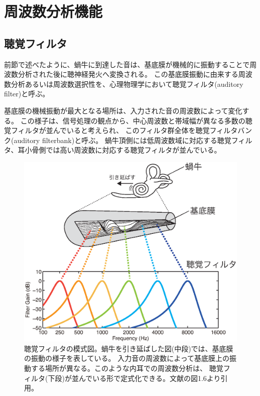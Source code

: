 \section{周波数分析機能}

\subsection{聴覚フィルタ}
前節で述べたように、蝸牛に到達した音は、基底膜が機械的に振動することで周波数分析された後に聴神経発火へ変換される。
この基底膜振動に由来する周波数分析あるいは周波数選択性を、心理物理学において聴覚フィルタ(auditory filter)と呼ぶ。

基底膜の機械振動が最大となる場所は、入力された音の周波数によって変化する。
この様子は、信号処理の観点から、中心周波数と帯域幅が異なる多数の聴覚フィルタが並んでいると考えられ、
このフィルタ群全体を聴覚フィルタバンク(auditory filterbank)と呼ぶ。
蝸牛頂側には低周波数域に対応する聴覚フィルタ、耳小骨側では高い周波数に対応する聴覚フィルタが並んでいる。

\begin{figure}[h]
  \vspace{20pt}
  \centering
  \includegraphics[width=0.6\hsize]{Figure/RelatedResearch/KiteimakuAudFilter.eps}
  \caption{聴覚フィルタの模式図。蝸牛を引き延ばした図(中段)では、基底膜の振動の様子を表している。
            入力音の周波数によって基底膜上の振動する場所が異なる。このような内耳での周波数分析は、
            聴覚フィルタ(下段)が並んでいる形で定式化できる。文献\cite{higashiyama2020WHIS}の図1.6より引用。}
  \label{fig:BasilarMembrane}
\end{figure}

